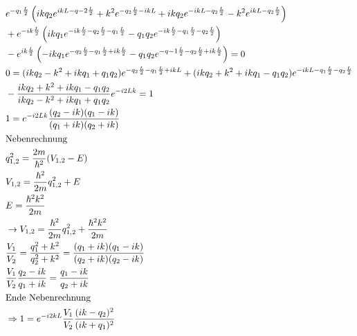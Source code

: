 \begin{align*}
    &e^{-q_1 \frac{L}{2}}\left(ik q_2 e^{ikL-q-2 \frac{L}{2}}+ k^2 e^{-q_2 \frac{L}{2} -ikL}+ikq_2 e^{-ikL -q_2 \frac{L}{2}}
    - k^2 e^{ikL-q_2 \frac{L}{2}} \right)\\
     &+ e^{-ik \frac{L}{2}} \left(ik q_1 e^{-ik \frac{L}{2}-q_2\frac{L}{2}-q_1\frac{L}{2}}
    -q_1 q_2 e^{-ik\frac{L}{2}-q_1 \frac{L}{2}-q_2 \frac{L}{2}} \right)\\
    &-e^{ik\frac{L}{2}}\left( 
        -ikq_1 e^{-q_2 \frac{L}{2}-q_1\frac{L}{2} +ik \frac{L}{2} }-q_1 q_2 e^{-q-1\frac{L}{2} -q_2\frac{L}{2} +ik \frac{L}{2}} \right)=0\\
        &0= (ik q_2 -k^2+ ik q_1 +q_1 q_2) e^{-q_2 \frac{L}{2} - q_1 \frac{L}{2} +ikL }
        +(ikq_2 + k^2 +ikq_1 -q_1 q_2) e^{-ikL-q_1 \frac{L}{2} - q_2 \frac{L}{2}}\\
    &-\frac{ikq_2 + k^2 + ik q_1 -q_1 q_2}{ik q_2 - k^2 + ik q_1 + q_1 q_2} e^{-i2Lk} = 1\\
    &1= e^{-i2Lk} \frac{(q_2-ik)(q_1-ik)}{(q_1 + ik)(q_2+ik)}\\
    \intertext{Nebenrechnung}
    & q_{1,2}^2 = \frac{2m}{\hbar ^2} (V_{1,2}-E )\\
    & V_{1,2} = \frac{\hbar ^2}{2m} q_{1,2}^2+E\\
    &E= \frac{\hbar ^2 k^2}{2m}\\
    &\to V_{1,2} = \frac{\hbar ^2}{2m} q_{1,2}^2+\frac{\hbar ^2 k^2}{2m}\\
    &\frac{V_1}{V_2}= \frac{q_1^2 +k^2}{q_2^2 +k^2} =\frac{(q_1 +ik)(q_1-ik)}{(q_2+ik)(q_2-ik)}\\
    & \frac{V_1}{V_2} \frac{q_2-ik}{q_1+ik} = \frac{q_1-ik}{q_2 +ik}\\
    \intertext{Ende Nebenrechnung}
    & \Rightarrow 1 = e^{-i2kL} \frac{V_1}{V_2} \frac{(ik-q_2)^2}{(ik+q_1)^2}
\end{align*}


